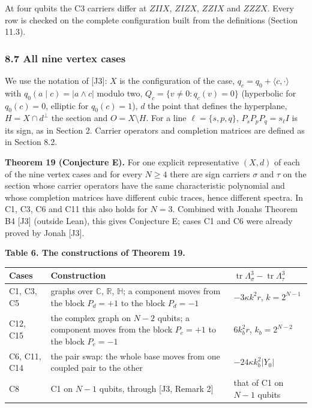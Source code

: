 \documentclass[11pt,a4paper]{article}
\begin{document}
At four qubits the C3 carriers differ at \(ZIIX\), \(ZIZX\), \(ZZIX\) and \(ZZZX\). Every row is checked on the
complete configuration built from the definitions (Section 11.3).

\subsubsection{8.7 All nine vertex cases}\label{87-all-nine-vertex-cases}

We use the notation of {[}J3{]}: \(X\) is the configuration of the case, \(q_c=q_0+\langle c,\cdot\rangle\) with
\(q_0(a\mid c)=|a\wedge c|\) modulo two, \(Q_c=\{v\neq0:q_c(v)=0\}\) (hyperbolic for \(q_0(c)=0\), elliptic for
\(q_0(c)=1\)), \(d\) the point that defines the hyperplane, \(H=X\cap d^\perp\) the section and \(O=X\setminus H\).
For a line \(\ell=\{s,p,q\}\), \(P_sP_pP_q=s_\ell I\) is its sign, as in Section 2. Carrier operators and
completion matrices are defined as
in Section 8.2.

\textbf{Theorem 19 (Conjecture E).} For one explicit representative \((X,d)\) of each of the nine vertex cases and for every \(N\ge4\) there are sign
carriers \(\sigma\) and \(\tau\) on the section whose carrier operators have the same characteristic polynomial
and whose completion matrices have different cubic traces, hence different spectra. In C1, C3, C6 and
C11 this also holds for \(N=3\). Combined with Jonah\textquotesingle s Theorem B4 {[}J3{]} (outside Lean), this gives Conjecture E; cases C1 and C6 were already proved by Jonah {[}J3{]}.

\textbf{Table 6. The constructions of Theorem 19.}

{\def\LTcaptype{none} %
{\small
\begin{longtable}[]{@{}>{\raggedright\arraybackslash}p{}>{\raggedright\arraybackslash}p{}>{\raggedright\arraybackslash}p{}@{}}
\toprule\noalign{}
Cases & Construction & \(\operatorname{tr}\Lambda_\sigma^3-\operatorname{tr}\Lambda_\tau^3\) \\
\midrule\noalign{}
\endhead
\bottomrule\noalign{}
\endlastfoot
C1, C3, C5 & graphs over \(\mathbb C\), \(\mathbb R\), \(\mathbb H\); a component moves from the block \(P_d=+1\) to the block \(P_d=-1\) & \(-3\kappa k^2r\), \(k=2^{N-1}\) \\
C12, C15 & the complex graph on \(N-2\) qubits; a component moves from the block \(P_e=+1\) to the block \(P_e=-1\) & \(6k_b^2r\), \(k_b=2^{N-2}\) \\
C6, C11, C14 & the pair swap: the whole base moves from one coupled pair to the other & \(-24\kappa k_b^2\lvert Y_0\rvert\) \\
C8 & C1 on \(N-1\) qubits, through {[}J3, Remark 2{]} & that of C1 on \(N-1\) qubits \\
\end{longtable}
}
}
\end{document}

